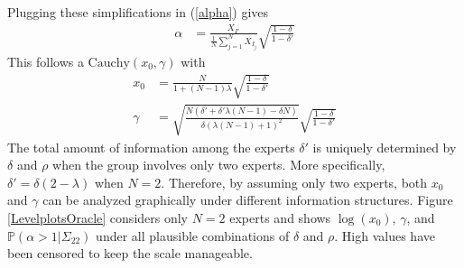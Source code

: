 \documentclass[11pt]{article}
\renewcommand{\P}{\mathbb{P}}
\theoremstyle{definition}
\theoremstyle{definition}
\begin{document}
Plugging these simplifications in (\ref{alpha}) gives 
\begin{align}
\alpha &= \frac{X_{I'}}{\frac{1}{N}\sum_{j=1}^N X_{I_j}} \sqrt{\frac{1-\delta}{1-\delta'}} \label{CompoundAlpha}
\end{align}
This follows a $\text{Cauchy}(x_0, \gamma)$ with
\begin{align*}
x_0 &= \frac{N}{1+(N-1)\lambda}  \sqrt{\frac{1-\delta}{1-\delta'}}\\
 \gamma &=  \sqrt{\frac{N(\delta' + \delta' \lambda (N-1) - \delta N)}{\delta (\lambda (N-1) + 1)^2}}\sqrt{\frac{1-\delta}{1-\delta'}}
\end{align*}
The total amount of information among the experts $\delta'$ is uniquely determined by $\delta$ and $\rho$ when the group involves only two experts. More specifically, $\delta' = \delta(2 - \lambda)$ when $N=2$. Therefore, by assuming only two experts, both $x_0$ and $\gamma$ can be analyzed graphically under different information structures. Figure \ref{LevelplotsOracle} considers only $N=2$ experts and shows $\log(x_0)$, $\gamma$, and $\P(\alpha > 1 | \Sigma_{22})$ under all plausible combinations of $\delta$ and $\rho$. High values have been censored to keep the scale manageable. 
\end{document}
